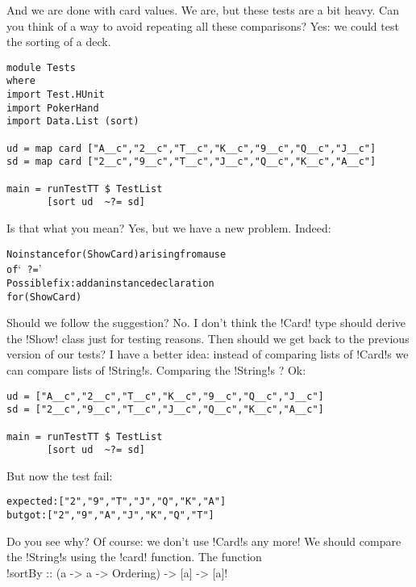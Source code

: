 \success And we are done with card values.
\lhN We are, but these tests are a bit heavy. Can you think of a way to avoid repeating all these comparisons?
\lhA Yes: we could test the sorting of a deck.
\lhN  
\begin{lstlisting}[frame=single]
module Tests
where 
import Test.HUnit
import PokerHand
import Data.List (sort)

ud = map card ["A__c","2__c","T__c","K__c","9__c","Q__c","J__c"]
sd = map card ["2__c","9__c","T__c","J__c","Q__c","K__c","A__c"]

main = runTestTT $ TestList 
       [sort ud  ~?= sd]
\end{lstlisting} %
Is that what you mean?
\lhA \error Yes, but we have a new problem.
\lhN \error Indeed:
\begin{small}
\begin{alltt}
No instance for (Show Card) arising from a use 
of `~?='
Possible fix: add an instance declaration 
for (Show Card)
\end{alltt}
\end{small}
Should we follow the suggestion?
\lhA \error No. I don't think the \il!Card! type should derive the \il!Show! class just for testing reasons.
\lhN Then should we get back to the previous version of our tests?
\lhA I have a better idea: instead of comparing lists of \il!Card!s we can compare lists of \il!String!s.
\lhN \error Comparing the \il!String!s ? Ok:
\begin{lstlisting}[frame=single]
ud = ["A__c","2__c","T__c","K__c","9__c","Q__c","J__c"]
sd = ["2__c","9__c","T__c","J__c","Q__c","K__c","A__c"]

main = runTestTT $ TestList 
       [sort ud  ~?= sd]
\end{lstlisting} %
\failure But now the test fail:
\begin{small}
\begin{alltt}
expected: ["2\monoclubs","9\monoclubs","T\monoclubs","J\monoclubs","Q\monoclubs","K\monoclubs","A\monoclubs"]
 but got: ["2\monoclubs","9\monoclubs","A\monoclubs","J\monoclubs","K\monoclubs","Q\monoclubs","T\monoclubs"]
\end{alltt}
\end{small}
Do you see why?
\lhA \failure Of course: we don't use \il!Card!s any more! We should compare the \il!String!s using the \il!card! function. The function \\

\il!sortBy :: (a -> a -> Ordering) -> [a] -> [a]! \\

